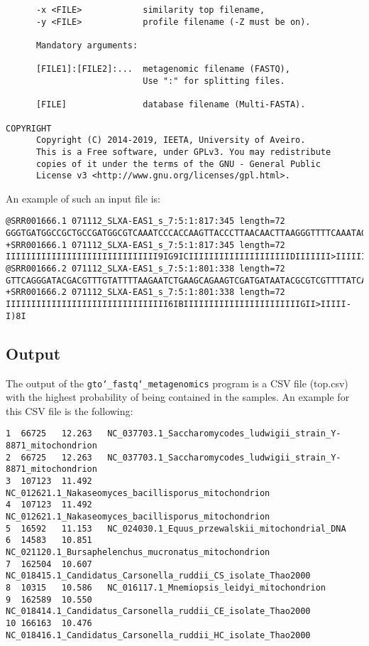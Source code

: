 \begin{lstlisting}
      -x <FILE>            similarity top filename,                      
      -y <FILE>            profile filename (-Z must be on).             
                                                                         
      Mandatory arguments:                                               
                                                                         
      [FILE1]:[FILE2]:...  metagenomic filename (FASTQ),                 
                           Use ":" for splitting files.                
                                                                         
      [FILE]               database filename (Multi-FASTA).              
                                                                         
COPYRIGHT                                                                
      Copyright (C) 2014-2019, IEETA, University of Aveiro.              
      This is a Free software, under GPLv3. You may redistribute         
      copies of it under the terms of the GNU - General Public           
      License v3 <http://www.gnu.org/licenses/gpl.html>.    
\end{lstlisting}
An example of such an input file is:
\begin{lstlisting}
@SRR001666.1 071112_SLXA-EAS1_s_7:5:1:817:345 length=72
GGGTGATGGCCGCTGCCGATGGCGTCAAATCCCACCAAGTTACCCTTAACAACTTAAGGGTTTTCAAATAGA
+SRR001666.1 071112_SLXA-EAS1_s_7:5:1:817:345 length=72
IIIIIIIIIIIIIIIIIIIIIIIIIIIIII9IG9ICIIIIIIIIIIIIIIIIIIIIDIIIIIII>IIIIII/
@SRR001666.2 071112_SLXA-EAS1_s_7:5:1:801:338 length=72
GTTCAGGGATACGACGTTTGTATTTTAAGAATCTGAAGCAGAAGTCGATGATAATACGCGTCGTTTTATCAT
+SRR001666.2 071112_SLXA-EAS1_s_7:5:1:801:338 length=72
IIIIIIIIIIIIIIIIIIIIIIIIIIIIIIII6IBIIIIIIIIIIIIIIIIIIIIIIIGII>IIIII-I)8I
\end{lstlisting}

\subsection*{Output}
The output of the \texttt{gto\char`_fastq\char`_metagenomics} program is a CSV file (top.csv) with the highest probability of being contained in the samples. An example for this CSV file is the following:
\begin{lstlisting}
1  66725   12.263   NC_037703.1_Saccharomycodes_ludwigii_strain_Y-8871_mitochondrion
2  66725   12.263   NC_037703.1_Saccharomycodes_ludwigii_strain_Y-8871_mitochondrion
3  107123  11.492   NC_012621.1_Nakaseomyces_bacillisporus_mitochondrion
4  107123  11.492   NC_012621.1_Nakaseomyces_bacillisporus_mitochondrion
5  16592   11.153   NC_024030.1_Equus_przewalskii_mitochondrial_DNA
6  14583   10.851   NC_021120.1_Bursaphelenchus_mucronatus_mitochondrion
7  162504  10.607   NC_018415.1_Candidatus_Carsonella_ruddii_CS_isolate_Thao2000
8  10315   10.586   NC_016117.1_Mnemiopsis_leidyi_mitochondrion
9  162589  10.550   NC_018414.1_Candidatus_Carsonella_ruddii_CE_isolate_Thao2000
10 166163  10.476   NC_018416.1_Candidatus_Carsonella_ruddii_HC_isolate_Thao2000
\end{lstlisting}
